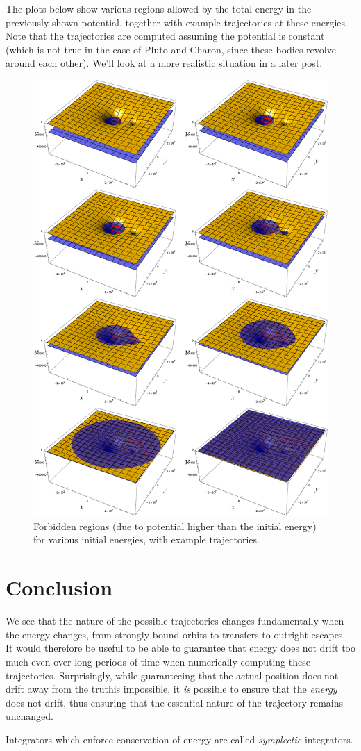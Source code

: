 \documentclass[10pt, a4paper, twoside]{basestyle}
\begin{document}
The plots below show various regions allowed by the total energy in the
previously shown potential, together with example trajectories at these
energies. Note that the trajectories are computed assuming the potential is
constant (which is not true in the case of Pluto and Charon, since these bodies
revolve around each other). We'll look at a more realistic situation in a later
post.
\begin{figure}
\includegraphics[scale=0.40]{rising-energy.png}
\caption{Forbidden regions (due to potential higher than the initial energy) for
various initial energies, with example trajectories.}
\end{figure}

\section{Conclusion}
We see that the nature of the possible trajectories changes fundamentally when
the energy changes, from strongly-bound orbits to transfers to outright escapes.
It would therefore be useful to be able to guarantee that energy does not drift
too much even over long periods of time when numerically computing these
trajectories. Surprisingly, while guaranteeing that the actual position does not
drift away from the truthis impossible, it \emph{is} possible to ensure that the
\emph{energy} does not drift, thus ensuring that the essential nature of the
trajectory remains unchanged.

Integrators which enforce conservation of energy are called \emph{symplectic}
integrators.
\end{document}
